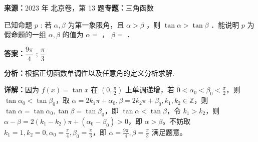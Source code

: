\begin{question}[points=5]
\textbf{来源：}2023 年 北京卷，第 13 题\quad \textbf{专题：}三角函数\par
已知命题 $p$ : 若 $\alpha, \beta$ 为第一象限角，且 $\alpha > \beta$ ，则 $\tan \alpha > \tan \beta$ ．能说明 $p$ 为假命题的一组 $\alpha, \beta$ 的值为 $\alpha =$ ， $\beta =$ ．
\begin{solution}
\textbf{答案：}$\dfrac{9\pi}{4}$ ; $\dfrac{\pi}{3}$

\textbf{分析：}根据正切函数单调性以及任意角的定义分析求解.

\textbf{详解：}因为 $f(x)=\tan x$ 在 $(0,\frac{\pi}{2})$ 上单调递增，若 $0<\alpha_0<\beta_0<\frac{\pi}{2}$，则 $\tan\alpha_0<\tan\beta_0$，取 $\alpha=2k_1\pi+\alpha_0, \beta=2k_2\pi+\beta_0, k_1,k_2\in\mathbb{Z}$，则 $\tan\alpha=\tan\alpha_0, \tan\beta=\tan\beta_0$，即 $\tan\alpha<\tan\beta$，令 $k_1>k_2$，则 $\alpha-\beta=2(k_1-k_2)\pi+(\alpha_0-\beta_0)>0$，即 $\alpha>\beta$。不妨取 $k_1=1,k_2=0,\alpha_0=\frac{\pi}{4},\beta_0=\frac{\pi}{3}$，即 $\alpha=\frac{9\pi}{4},\beta=\frac{\pi}{3}$ 满足题意。
\end{solution}
\end{question}


